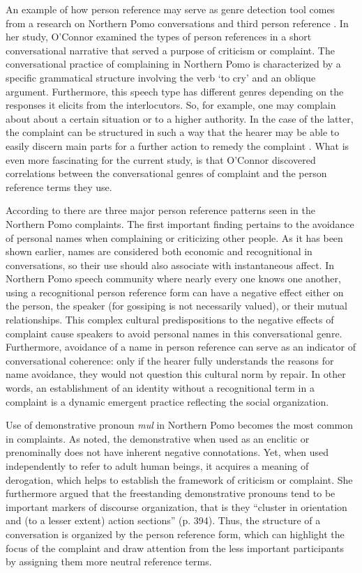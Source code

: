 \documentclass[12pt]{article}
\begin{document}
An example of how person reference may serve as genre detection tool comes from a research on Northern Pomo conversations and third person reference \parencite{oconnor1990}. In her study, O'Connor examined the types of person references in a short conversational narrative that served a purpose of criticism or complaint. The conversational practice of complaining in Northern Pomo is characterized by a specific grammatical structure involving the verb `to cry' and an oblique argument. Furthermore, this speech type has different genres depending on the responses it elicits from the interlocutors. So, for example, one may complain about about a certain situation or to a higher authority. In the case of the latter, the complaint can be structured in such a way that the hearer may be able to easily discern main parts for a further action to remedy the complaint \parencite[p. 381]{oconnor1990}. What is even more fascinating for the current study, is that O'Connor discovered correlations between the conversational genres of complaint and the person reference terms they use. 

According to \textcite{oconnor1990} there are three major person reference patterns seen in the Northern Pomo complaints. The first important finding pertains to the avoidance of personal names when complaining or criticizing other people. As it has been shown earlier, names are considered both economic and recognitional in conversations, so their use should also associate with instantaneous affect. In Northern Pomo speech community where nearly every one knows one another, using a recognitional person reference form can have a negative effect either on the person, the speaker (for gossiping is not necessarily valued), or their mutual relationships. This complex cultural predispositions to the negative effects of complaint cause speakers to avoid personal names in this conversational genre. Furthermore, avoidance of a name in person reference can serve as an indicator of conversational coherence: only if the hearer fully understands the reasons for name avoidance, they would not question this cultural norm by repair. In other words, an establishment of an identity without a recognitional term in a complaint is a dynamic emergent practice reflecting the social organization.

Use of demonstrative pronoun \textit{mul} in Northern Pomo becomes the most common in complaints. As \textcite{oconnor1990} noted, the demonstrative when used as an enclitic or prenominally does not have inherent negative connotations. Yet, when used independently to refer to adult human beings, it acquires a meaning of derogation, which helps to establish the framework of criticism or complaint. She furthermore argued that the freestanding demonstrative pronouns tend to be important markers of discourse organization, that is they ``cluster in orientation and (to a lesser extent) action sections'' (p. 394). Thus, the structure of a conversation is organized by the person reference form, which can highlight the focus of the complaint and draw attention from the less important participants by assigning them more neutral reference terms. 
\end{document}
